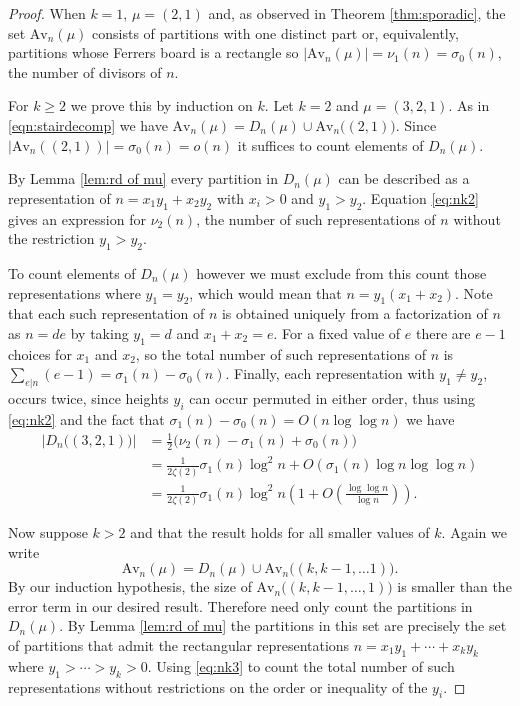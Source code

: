 \documentclass{article}
\theoremstyle{plain}
\theoremstyle{definition}
\newcommand{\Av}{\text{Av}}
\begin{document}
\begin{proof}
When $k=1$, $\mu = (2,1)$ and, as observed in Theorem \ref{thm:sporadic}, the set $\Av_n(\mu)$ consists of partitions with one distinct part or, equivalently, partitions whose Ferrers board is a rectangle so $|\Av_n(\mu)|=\nu_1(n)=\sigma_0(n)$, the number of divisors of $n$.


For $k\geq 2$ we prove this by induction on $k$.  Let $k=2$ and $\mu=(3,2,1)$. As in \eqref{eqn:stairdecomp} we have ${\Av_n(\mu)=D_n(\mu) \cup \Av_n\big((2,1)\big)}$. Since $|\Av_n((2,1))|=\sigma_0(n)=o(n)$ it suffices to count elements of  $D_n(\mu)$.   


By Lemma \ref{lem:rd of mu} every partition in $D_n(\mu)$ can be described as a representation of $n=x_1y_1+x_2y_2$ with $x_i>0$ and $y_1>y_2$. Equation \eqref{eq:nk2} gives an expression for $\nu_2(n)$, the number of such representations of $n$ without the restriction $y_1>y_2$. 

To count elements of $D_n(\mu)$ however we must exclude from this count those representations where $y_1=y_2$, which would mean that $n=y_1(x_1+x_2)$.  Note that each such representation of $n$ is obtained uniquely from a factorization of $n$ as $n=de$ by taking $y_1=d$ and $x_1+x_2=e$.   For a fixed value of $e$ there are $e-1$ choices for $x_1$ and $x_2$, so the total number of such representations of $n$ is $\displaystyle{\sum_{e|n} (e-1)} = \sigma_1(n)-\sigma_0(n)$.  Finally, each representation with $y_1 \neq y_2$, occurs twice, since heights $y_i$ can occur permuted in either order, thus using \eqref{eq:nk2} and the fact that $\sigma_1(n) - \sigma_0(n) = O(n\log\log n)$ we have
\begin{align*}
\left|D_n\big((3,2,1)\big)\right| &= \tfrac{1}{2}\big(\nu_2(n)-\sigma_1(n)+\sigma_0(n)\big)\\
&= \frac{1}{2\zeta(2)}\sigma_1(n)\log^2 n + O\left(\sigma_1(n)\log n \log \log n \right)\\
&= \frac{1}{2\zeta(2)}\sigma_1(n)\log^2 n \left(1+O\left(\frac{\log \log n}{\log n}\right)\right). \nonumber
\end{align*}


Now suppose $k>2$ and that the result holds for all smaller values of $k$.  Again we write
$$\Av_n(\mu) = D_n(\mu) \cup \Av_n\big((k,k-1,\ldots 1)\big).$$
By our induction hypothesis, the size of $\Av_n\big((k,k-1,\ldots, 1)\big)$ is smaller than the error term in our desired result.  Therefore need only count the partitions in $D_n(\mu)$.  By Lemma \ref{lem:rd of mu} the partitions in this set are precisely the set of partitions that admit the rectangular representations $n=x_1y_1+ \cdots + x_ky_k$ where $y_1> \cdots >y_k>0$.   Using \eqref{eq:nk3} to count the total number of such representations without restrictions on the order or inequality of the $y_i$.  


\end{proof}
\end{document}
